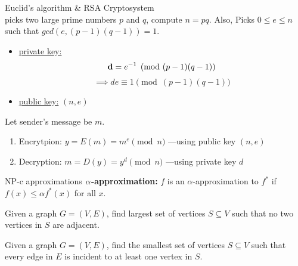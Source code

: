 \documentclass[10pt,a4paper]{article}
\begin{document}
\begin{multicols}{3}
\begin{textbox}{Euclid's algorithm \& RSA Cryptosystem}
         \\
         picks two large prime numbers $p$ and $q$, compute $n = pq$.
        Also, Picks $0 \le e \le n$ such that $gcd(e, (p-1)(q-1)) = 1$.
        \begin{itemize}
            \item \underline{private key:}
                  $${\bf d} = e^{-1} \pmod{(p-1)(q-1)}$$
                  $$\implies de \equiv 1 \pmod{(p-1)(q-1)}$$
            \item \underline{public key:} $(n, e)$
        \end{itemize}

         Let sender's message be $m$.
        \begin{enumerate}
            \item Encrytpion: $y = E(m) = m^e \pmod{n}$ —using public key $(n, e)$
            \item Decryption: $m = D(y) = y^{d} \pmod{n}$ —using private key $d$
        \end{enumerate}
    \end{textbox}


    \begin{textbox}{NP-c approximations}
        {\bf ${\bf \alpha}$-approximation:} $f$ is an $\alpha$-approximation to
        $f^*$ if $f(x) \leq \alpha f^*(x)$ for all $x$.

         Given a graph $G = (V, E)$, find largest set of
        vertices $S \subseteq V$ such that no two vertices in $S$ are adjacent.

         Given a graph $G = (V, E)$, find the smallest set of
        vertices $S \subseteq V$ such that every edge in $E$ is incident to at
        least one vertex in $S$.


\end{textbox}
\end{multicols}
\end{document}
